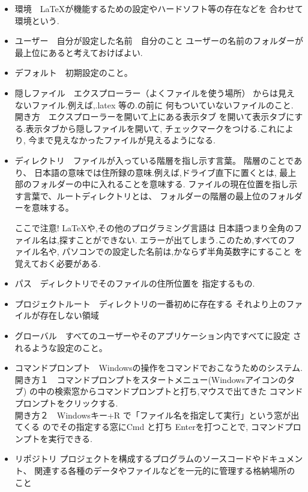 \documentclass{ltjsarticle}
\begin{document}
\begin{itemize}
  \item 環境　\LaTeX が機能するための設定やハードソフト等の存在などを
        合わせて環境という.
  \item ユーザー　自分が設定した名前　自分のこと
        ユーザーの名前のフォルダーが最上位にあると考えておけばよい.
  \item デフォルト　初期設定のこと。
  \item 隠しファイル　エクスプローラー（よくファイルを使う場所）
        からは見えないファイル.例えば,.latex 等の.の前に
        何もついていないファイルのこと.
        開き方　エクスプローラーを開いて上にある表示タブ
        を開いて表示タブにする.表示タブから隠しファイルを開いて,
        チェックマークをつける.これにより,
        今まで見えなかったファイルが見えるようになる.

  \item ディレクトリ　ファイルが入っている階層を指し示す言葉。
        階層のことであり、
        日本語の意味では住所録の意味.例えば,ドライブ直下に置くとは,
        最上部のフォルダーの中に入れることを意味する.
        ファイルの現在位置を指し示す言葉で、ルートディレクトリとは、
        フォルダーの階層の最上位のフォルダーを意味する。


        ここで注意! LaTeXや,その他のプログラミング言語は
        日本語つまり全角のファイル名は,探すことができない.
        エラーが出てしまう.このため,すべてのファイル名や,
        パソコンでの設定した名前は,かならず半角英数字にすること
        を覚えておく必要がある.
  \item パス　ディレクトリでそのファイルの住所位置を
        指定するもの.
  \item プロジェクトルート　ディレクトリの一番初めに存在する
        それより上のファイルが存在しない領域
  \item グローバル　すべてのユーザーやそのアプリケーション内ですべてに設定
        されるような設定のこと。
  \item コマンドプロンプト　Windowsの操作をコマンドでおこなうためのシステム.\\
        開き方１　コマンドプロンプトをスタートメニュー(Windowsアイコンのタブ)
        の中の検索窓からコマンドプロンプトと打ち,マウスで出てきた
        コマンドプロンプトをクリックする.\\
        開き方２　Windowsキー+R で「ファイル名を指定して実行」という窓が出てくる
        のでその指定する窓にCmd と打ち Enterを打つことで,
        コマンドプロンプトを実行できる.
  \item リポジトリ
        プロジェクトを構成するプログラムのソースコードやドキュメント、
         関連する各種のデータやファイルなどを一元的に管理する格納場所のこと

\end{itemize}
\end{document}
